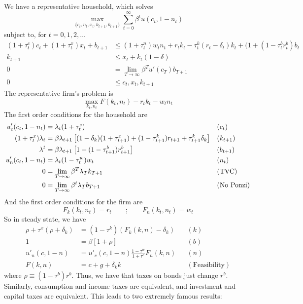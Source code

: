 \documentclass[10pt]{article}
\begin{document}
\begin{model}
	 We have a representative household, which solves \[\max_{\{c_t,n_t,x_t,k_{t+1},b_{t+1}\}} \sum_{t=0}^\infty \beta^t u(c_t,1-n_t)\]subject to, for $t = 0,1,2,\dots$ \begin{align*}
		(1 + \tau_t^c) c_t + (1+\tau_t^x)x_t + b_{t+1} &\le (1+\tau_t^n)w_tn_t + r_tk_t - \tau_t^k(r_t-\delta_t)k_t + (1+(1-\tau_t^br_t^b ) b_t \\
		k_{t+1} &\le x_t+ k_t (1-\delta) \\ 0 &= \lim_{T\to\infty}\beta^T u'(c_T)b_{T+1} \\ 0 &\le c_t,x_t,k_{t+1}
	\end{align*}
	The representative firm's problem is \[\max_{k_t,n_t} F(k_t,n_t) - r_tk_t - w_tn_t\]
	The first order conditions for the household are \begin{align*}
		u'_c(c_t, 1-n_t) &= \lambda_t(1+\tau_t^c) &&(c_t) \\ (1 + \tau_t^x)\lambda_t &= \beta \lambda_{t+1}\left[ (1-\delta_k) (1+\tau^x_{t+1}) + (1-\tau_{t+1}^k)r_{t+1} + \tau_{t+1}^k \delta_k\right] &&(k_{t+1}) \\
		\lambda^t &= \beta \lambda_{t+1}\left[ 1 + (1-\tau_{t+1}^b)r_{t+1}^b \right] &&(b_{t+1}) \\ u'_n(c_t,1-n_t) &= \lambda_t(1-\tau_t^w)w_t &&(n_t) \\
		0 &= \lim_{T\to\infty} \beta^T \lambda_T k_{T+1}  &&(\text{TVC}) \\
		0 &= \lim_{T\to\infty} \beta^t \lambda_T b_{T+1} &&(\text{No Ponzi})
	\end{align*}
	And the first order conditions for the firm are \[F_k(k_t,n_t) = r_t \qquad ; \qquad F_n(k_t,n_t) = w_t\]
	So in steady state, we have 
	\begin{align*}
		\rho + \tau^x (\rho + \delta_k ) &= (1-\tau^k)(F_k(k,n) - \delta_k) &&(k) \\
		1 &= \beta[1+\rho] &&(b) \\ u'_n(c,1-n) &= u'_c(c,1-n) \frac{1-\tau^w}{1+\tau^c} F_n(k,n) &&(n) \\ F(k,n) &= c + g + \delta_kk &&(\text{Feasibility})
	\end{align*}
	where $\rho \equiv (1-\tau^b)r^b$. Thus, we have that taxes on bonds just change $r^b$. Similarly, consumption and income taxes are equivalent, and investment and capital taxes are equivalent. This leads to two extremely famous results:
\end{model}
\end{document}
